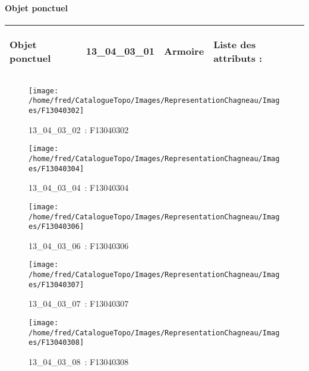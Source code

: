\documentclass[12pt,titlepage,oneside]{book}
\begin{document}
\paragraph{Objet ponctuel}
\noindent
\vspace{\baselineskip}

\renewcommand{\arraystretch}{1.2}
\begin{supertabular}{|p{10cm}|c|p{13cm}|p{12cm}|}
 Objet ponctuel & 13\_04\_03\_01 & Armoire & Liste des attributs :
\begin{enumerate}
\end{enumerate}
\\
\hline
\end{supertabular}
\begin{figure}[h!]
  \hfill         %
  \begin{minipage}[t]{3cm}
    \begin{center}
      \texttt{[image: /home/fred/CatalogueTopo/Images/RepresentationChagneau/Images/F13040302]}
      \caption[~13\_04\_03\_02]{\small{13\_04\_03\_02~:} \tiny{F13040302}}\label{F13040302}
    \end{center}
  \end{minipage}
  \begin{minipage}[t]{3cm}
    \begin{center}
      \texttt{[image: /home/fred/CatalogueTopo/Images/RepresentationChagneau/Images/F13040304]}
      \caption[~13\_04\_03\_04]{\small{13\_04\_03\_04~:} \tiny{F13040304}}\label{F13040304}
    \end{center}
  \end{minipage}
  \begin{minipage}[t]{3cm}
    \begin{center}
      \texttt{[image: /home/fred/CatalogueTopo/Images/RepresentationChagneau/Images/F13040306]}
      \caption[~13\_04\_03\_06]{\small{13\_04\_03\_06~:} \tiny{F13040306}}\label{F13040306}
    \end{center}
  \end{minipage}
  \begin{minipage}[t]{3cm}
    \begin{center}
      \texttt{[image: /home/fred/CatalogueTopo/Images/RepresentationChagneau/Images/F13040307]}
      \caption[~13\_04\_03\_07]{\small{13\_04\_03\_07~:} \tiny{F13040307}}\label{F13040307}
    \end{center}
  \end{minipage}
  \begin{minipage}[t]{3cm}
    \begin{center}
      \texttt{[image: /home/fred/CatalogueTopo/Images/RepresentationChagneau/Images/F13040308]}
      \caption[~13\_04\_03\_08]{\small{13\_04\_03\_08~:} \tiny{F13040308}}\label{F13040308}
    \end{center}
  \end{minipage}
\end{figure}
\end{document}
